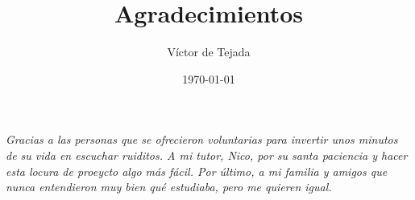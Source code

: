 \documentclass[a4paper,11pt]{article}
\title{Agradecimientos}
\author{Víctor de Tejada}
\date{\today}
\begin{document}
\thispagestyle{empty}


    

    \textit{Gracias a las personas que se ofrecieron voluntarias para invertir unos minutos de su vida en escuchar ruiditos. A mi tutor, Nico, por su santa paciencia y hacer esta locura de proeycto algo más fácil. Por último, a mi familia y amigos que nunca entendieron muy bien qué estudiaba, pero me quieren igual.}
\end{document}

